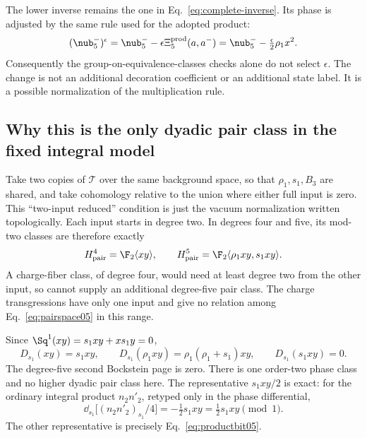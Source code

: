 The lower inverse remains the one in Eq.~\eqref{eq:complete-inverse}.
Its phase is adjusted by the same rule used for the adopted product:
\begin{equation}\label{eq:inverse05}
 (\nub_5^-)^{\epsilon}=\nub_5^-
       -\epsilon\Xi_5^{\mathrm{prod}}(a,a^-)
 =\nub_5^--\tfrac\epsilon2{\rho_1} x^2.
\end{equation}
Consequently the group-on-equivalence-classes checks alone do not select $\epsilon$. The change is not an additional decoration coefficient or an additional state label. It is a possible normalization of the multiplication rule.


\subsection{Why this is the only dyadic pair class in the fixed integral model}
Take two copies of $\mathcal T$ over the same background space, so that $\rho_1,s_1,B_3$ are shared, and take cohomology relative to the union where either full input is zero. This ``two-input reduced'' condition is just the vacuum normalization written topologically. Each input starts in degree two. In degrees four and five, its mod-two classes are therefore exactly
\begin{equation}\label{eq:pairspace05}
 H^4_{\mathrm{pair}}=\F_2\langle xy\rangle,
 \qquad H^5_{\mathrm{pair}}=\F_2\langle {\rho_1}xy,{s_1}xy\rangle.
\end{equation}
A charge-fiber class, of degree four, would need at least degree two from the other input, so cannot supply an additional degree-five pair class. The charge transgressions have only one input and give no relation among Eq.~\eqref{eq:pairspace05} in this range.

Since $\Sq^1(xy)={s_1}x y+x{s_1} y=0$,
\begin{equation}\label{eq:pairbss05}
 D_{s_1}(xy)={s_1}xy,
 \qquad D_{s_1}({\rho_1}xy)={\rho_1}({\rho_1}+{s_1})xy,
 \qquad D_{s_1}({s_1}xy)=0.
\end{equation}
The degree-five second Bockstein page is zero. There is one order-two phase class and no higher dyadic pair class here. The representative ${s_1}xy/2$ is exact: for the ordinary integral product ${n_2}{n'_2}$, retyped only in the phase differential,
\begin{equation}
 \dd_{s_1}\big[({n_2}{n'_2})_{s_1}/4\big]=-\tfrac12{s_1}xy=\tfrac12{s_1}xy\pmod1.
\end{equation}
The other representative is precisely Eq.~\eqref{eq:productbit05}.

